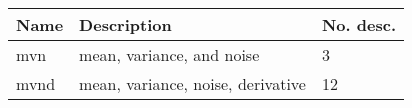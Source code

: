\begin{tabular}{lll}
	\toprule
    Name & Description                       & No. desc. \\
	\midrule
    mvn  & mean, variance, and noise         & 3         \\
    mvnd & mean, variance, noise, derivative & 12        \\
    \bottomrule
\end{tabular}
